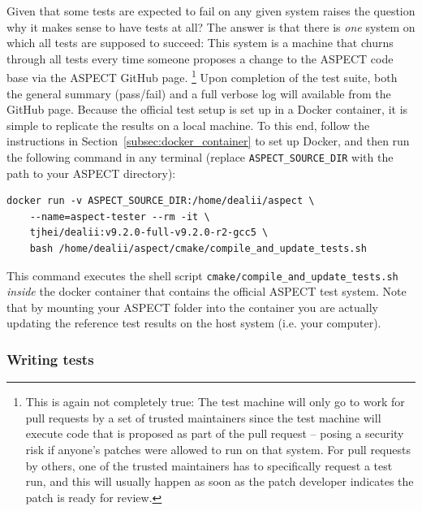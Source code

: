\documentclass{article}
\newcommand{\aspect}{\textsc{ASPECT}}
\begin{document}
Given that some tests are expected to fail on any given system raises the
question why it makes sense to have tests at all? The answer is that there is
\textit{one} system on which all tests are supposed to succeed: This system is a
machine that churns through all tests every time someone proposes a change to
the \aspect{} code base via the \aspect{} GitHub page.%
\footnote{This is again not completely true: The test machine will only go to
work for pull requests by a set of trusted maintainers since the test machine
will execute code that is proposed as part of the pull request -- posing a
security risk if anyone's patches were allowed to run on that system. For pull
requests by others, one of the trusted maintainers has to specifically request a
test run, and this will usually happen
as soon as the patch developer indicates the patch is ready for review.}
Upon completion of the test suite, both the general summary (pass/fail) and a
full verbose log will available from the GitHub page. Because the official test
setup is set up in a Docker container, it is simple to replicate the results on
a local machine. To this end, follow the instructions in
Section~\ref{subsec:docker_container} to set up Docker, and then run the
following command in any terminal (replace \texttt{ASPECT\_SOURCE\_DIR} with
the path to your \aspect{} directory):
\begin{lstlisting}[frame=single,language=ksh]
    docker run -v ASPECT_SOURCE_DIR:/home/dealii/aspect \
    --name=aspect-tester --rm -it \
    tjhei/dealii:v9.2.0-full-v9.2.0-r2-gcc5 \
    bash /home/dealii/aspect/cmake/compile_and_update_tests.sh
\end{lstlisting}

This command executes the shell script
\texttt{cmake/compile\_and\_update\_tests.sh} \textit{inside} the docker
container that contains the official \aspect{} test system. Note that by
mounting your \aspect{} folder into the container you are actually updating the
reference test results on the host system (i.e. your computer).


\subsubsection{Writing tests}
\label{sec:writing_tests}
\end{document}
